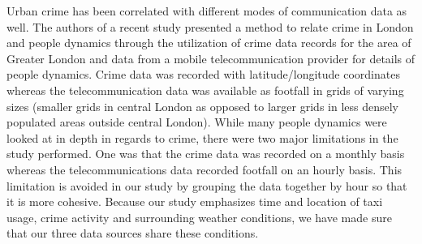 \documentclass{sigkddExp}
\begin{document}
Urban crime has been correlated with different modes of communication data as well. The authors of a recent study \cite{Traunmueller14} presented a method to relate crime in London and people dynamics through the utilization of crime data records for the area of Greater London and data from a mobile telecommunication provider for details of people dynamics. Crime data was recorded with latitude/longitude coordinates whereas the telecommunication data was available as footfall in grids of varying sizes (smaller grids in central London as opposed to larger grids in less densely populated areas outside central London). While many people dynamics were looked at in depth in regards to crime, there were two major limitations in the study performed. One was that the crime data was recorded on a monthly basis whereas the telecommunications data recorded footfall on an hourly basis. This limitation is avoided in our study by grouping the data together by hour so that it is more cohesive. Because our study emphasizes time and location of taxi usage, crime activity and surrounding weather conditions, we have made sure that our three data sources share these conditions.
\end{document}
